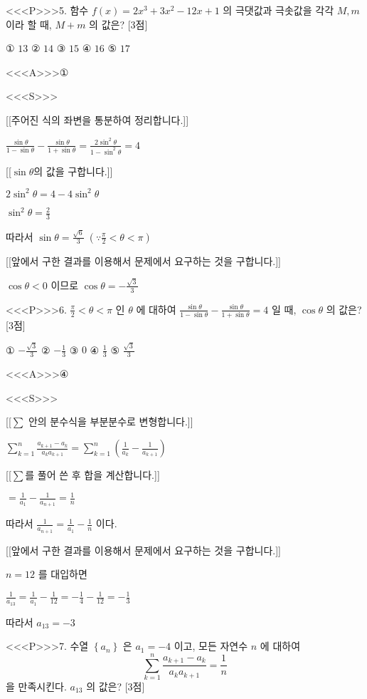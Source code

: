 \documentclass{oblivoir}
\begin{document}
<<<P>>>5. 함수 $f(x)=2 x^{3}+3 x^{2}-12 x+1$ 의 극댓값과 극솟값을 각각 $M, m$ 이라 할 때, $M+m$ 의 값은? [3점]

① $13$
② $14$
③ $15$
④ $16$
⑤ $17$

<<<A>>>①

<<<S>>>

[[주어진 식의 좌변을 통분하여 정리합니다.]]

$ \frac{\sin \theta}{1-\sin \theta}-\frac{\sin \theta}{1+\sin \theta}=\frac{2 \sin ^{2} \theta}{1-\sin ^{2} \theta}=4$

[[$\sin \theta$의 값을 구합니다.]]

$2 \sin ^{2} \theta=4-4 \sin ^{2} \theta$

$\sin ^{2} \theta=\frac{2}{3}$

따라서 $\sin \theta=\frac{\sqrt{6}}{3}\;\left(\because \frac{\pi}{2}<\theta<\pi\right)$

[[앞에서 구한 결과를 이용해서 문제에서 요구하는 것을 구합니다.]]

$\cos \theta<0$ 이므로 $\cos \theta=-\frac{\sqrt{3}}{3}$


<<<P>>>6. $\frac{\pi}{2}<\theta<\pi$ 인 $\theta$ 에 대하여 $\frac{\sin \theta}{1-\sin \theta}-\frac{\sin \theta}{1+\sin \theta}=4$ 일 때, $\cos \theta$ 의 값은? [3점]

① $-\frac{\sqrt{3}}{3}$
② $-\frac{1}{3}$
③ $0$
④ $\frac{1}{3}$
⑤ $\frac{\sqrt{3}}{3}$

<<<A>>>④

<<<S>>>

[[$\displaystyle\sum$ 안의 분수식을 부분분수로 변형합니다.]]

$ \sum_{k=1}^{n} \frac{a_{k+1}-a_{k}}{a_{k} a_{k+1}} =\sum_{k=1}^{n}\left(\frac{1}{a_{k}}-\frac{1}{a_{k+1}}\right)$

[[$\displaystyle\sum$를 풀어 쓴 후 합을 계산합니다.]]

$=\frac{1}{a_{1}}-\frac{1}{a_{n+1}}=\frac{1}{n}$

따라서 $\frac{1}{a_{n+1}}=\frac{1}{a_{1}}-\frac{1}{n}$ 이다.

[[앞에서 구한 결과를 이용해서 문제에서 요구하는 것을 구합니다.]]

$n=12$ 를 대입하면

$\frac{1}{a_{13}}=\frac{1}{a_{1}}-\frac{1}{12}=-\frac{1}{4}-\frac{1}{12}=-\frac{1}{3}$

따라서 $a_{13}=-3$


<<<P>>>7. 수열 $\left\{a_{n}\right\}$ 은 $a_{1}=-4$ 이고, 모든 자연수 $n$ 에 대하여
$$
\sum_{k=1}^{n} \frac{a_{k+1}-a_{k}}{a_{k} a_{k+1}}=\frac{1}{n}
$$
을 만족시킨다. $a_{13}$ 의 값은? [3점]
\end{document}
